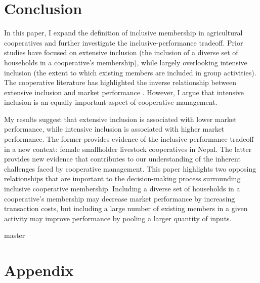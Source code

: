 \documentclass[11pt]{article}
\begin{document}
\section{Conclusion}

In this paper, I expand the definition of inclusive membership in agricultural cooperatives and further investigate the inclusive-performance tradeoff. Prior studies have focused on extensive inclusion (the inclusion of a diverse set of households in a cooperative's membership), while largely overlooking intensive inclusion (the extent to which existing members are included in group activities). The cooperative literature has highlighted the inverse relationship between extensive inclusion and market performance \cite{bernard_reaching_2009}. However, I argue that intensive inclusion is an equally important aspect of cooperative management. 

My results suggest that extensive inclusion is associated with lower market performance, while intensive inclusion is associated with higher market performance. The former provides evidence of the inclusive-performance tradeoff in a new context: female smallholder livestock cooperatives in Nepal. The latter provides new evidence that contributes to our understanding of the inherent challenges faced by cooperative management.  This paper highlights two opposing relationships that are important to the decision-making process surrounding inclusive cooperative membership. Including a diverse set of households in a cooperative's membership may decrease market performance by increasing transaction costs, but including a large number of existing members in a given activity may improve performance by pooling a larger quantity of inputs. 


\newpage
 {master}


\appendix
\setcounter{table}{0}
\setcounter{figure}{0}
\setcounter{equation}{0}
\renewcommand\thetable{\Alph{section}.\arabic{table}}
\renewcommand\thefigure{\Alph{section}.\arabic{figure}}
\renewcommand\theequation{\Alph{section}.\arabic{equation}}%

\newpage


\section{Appendix}
\end{document}
